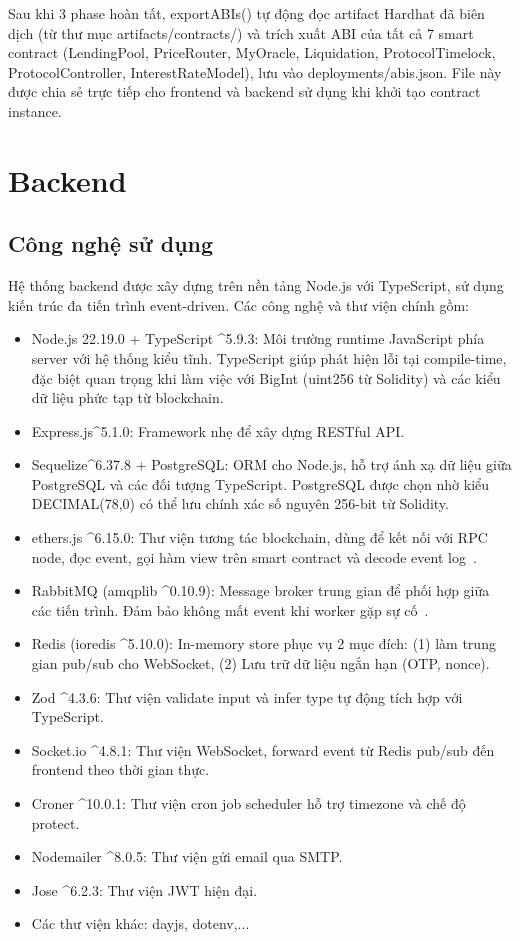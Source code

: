 \documentclass[../DoAn.tex]{subfiles}
\begin{document}
Sau khi 3 phase hoàn tất, exportABIs() tự động đọc artifact Hardhat đã biên dịch (từ thư mục artifacts/contracts/) và trích xuất ABI của tất cả 7 smart contract (LendingPool, PriceRouter, MyOracle, Liquidation, ProtocolTimelock, ProtocolController, InterestRateModel), lưu vào deployments/abis.json. File này được chia sẻ trực tiếp cho frontend và backend sử dụng khi khởi tạo contract instance.

\section{Backend}


\subsection{Công nghệ sử dụng}


Hệ thống backend được xây dựng trên nền tảng Node.js với TypeScript, sử dụng kiến trúc đa tiến trình event-driven. Các công nghệ và thư viện chính gồm:

\begin{itemize}
  \item Node.js 22.19.0 + TypeScript \textasciicircum{}5.9.3: Môi trường runtime JavaScript phía server với hệ thống kiểu tĩnh. TypeScript giúp phát hiện lỗi tại compile-time, đặc biệt quan trọng khi làm việc với BigInt (uint256 từ Solidity) và các kiểu dữ liệu phức tạp từ blockchain.
  \item Express.js\textasciicircum{}5.1.0: Framework nhẹ để xây dựng RESTful API.
  \item Sequelize\textasciicircum{}6.37.8 + PostgreSQL: ORM cho Node.js, hỗ trợ ánh xạ dữ liệu giữa PostgreSQL và các đối tượng TypeScript. PostgreSQL được chọn nhờ kiểu DECIMAL(78,0) có thể lưu chính xác số nguyên 256-bit từ Solidity.
  \item ethers.js \textasciicircum{}6.15.0: Thư viện tương tác blockchain, dùng để kết nối với RPC node, đọc event, gọi hàm view trên smart contract và decode event log~\cite{EthersJsDocs}.
  \item RabbitMQ (amqplib \textasciicircum{}0.10.9): Message broker trung gian để phối hợp giữa các tiến trình. Đảm bảo không mất event khi worker gặp sự cố~\cite{RabbitMQDocs}.
  \item Redis (ioredis \textasciicircum{}5.10.0): In-memory store phục vụ 2 mục đích: (1) làm trung gian pub/sub cho WebSocket, (2) Lưu trữ dữ liệu ngắn hạn (OTP, nonce).
  \item Zod \textasciicircum{}4.3.6: Thư viện validate input và infer type tự động tích hợp với TypeScript.
  \item Socket.io \textasciicircum{}4.8.1: Thư viện WebSocket, forward event từ Redis pub/sub đến frontend theo thời gian thực.
  \item Croner \textasciicircum{}10.0.1: Thư viện cron job scheduler hỗ trợ timezone và chế độ protect.
  \item Nodemailer \textasciicircum{}8.0.5: Thư viện gửi email qua SMTP.
  \item Jose \textasciicircum{}6.2.3: Thư viện JWT hiện đại.
  \item Các thư viện khác: dayjs, dotenv,...
\end{itemize}
\end{document}
